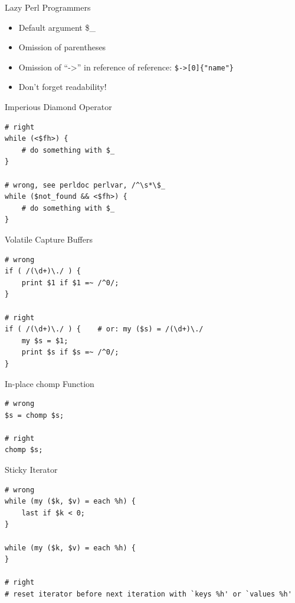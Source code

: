 \documentclass{beamer}
\begin{document}
\begin{frame}{Lazy Perl Programmers}
    \begin{itemize}
        \item   Default argument \$\_
        \item   Omission of parentheses
        \item   Omission of ``->'' in reference of reference: \texttt{\$->[0]\{"name"\}}
        \item   Don't forget readability!
    \end{itemize}
\end{frame}

\begin{frame}[containsverbatim]{Imperious Diamond Operator}
\begin{lstlisting}[caption=Imperious Diamond Operator]
# right
while (<$fh>) {
    # do something with $_
}

# wrong, see perldoc perlvar, /^\s*\$_
while ($not_found && <$fh>) {
    # do something with $_
}
\end{lstlisting}
\end{frame}

\begin{frame}[containsverbatim]{Volatile Capture Buffers}
\begin{lstlisting}[caption=Volatile Capture Buffers]
# wrong
if ( /(\d+)\./ ) {
    print $1 if $1 =~ /^0/;
}

# right
if ( /(\d+)\./ ) {    # or: my ($s) = /(\d+)\./
    my $s = $1;
    print $s if $s =~ /^0/;
}
\end{lstlisting}
\end{frame}


\begin{frame}[containsverbatim]{In-place chomp Function}
\begin{lstlisting}[caption=In-place chomp Function]
# wrong
$s = chomp $s;

# right
chomp $s;
\end{lstlisting}
\end{frame}


\begin{frame}[containsverbatim]{Sticky Iterator}
\begin{lstlisting}[caption=Sticky Iterator]
# wrong
while (my ($k, $v) = each %h) {
    last if $k < 0;
}

while (my ($k, $v) = each %h) {
}

# right
# reset iterator before next iteration with `keys %h' or `values %h'
\end{lstlisting}
\end{frame}
\end{document}
